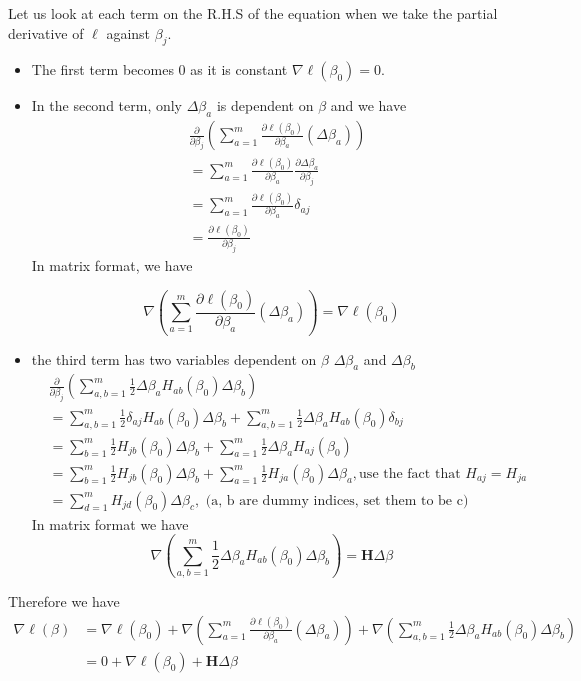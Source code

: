 \documentclass[12pt, oneside]{article}
\begin{document}
Let us look at each term on the R.H.S of the equation when we take the partial derivative of $\ell$ against $\beta_j$. 
\begin{itemize}
\item The first term becomes 0 as it is constant $\nabla \ell(\beta_0)=0$.
\item In the second term, only $\Delta\beta_a$ is dependent on $\beta$ and we have
\begin{align*}
&\frac{\partial}{\partial\beta_j}\left(\sum\limits_{a=1}^m\frac{\partial{\ell(\beta_0)}}{\partial\beta_a}(\Delta\beta_a)\right)\\
&=\sum\limits_{a=1}^m\frac{\partial{\ell(\beta_0)}}{\partial\beta_a}\frac{\partial \Delta\beta_a}{\partial\beta_j}\\
&=\sum\limits_{a=1}^m\frac{\partial{\ell(\beta_0)}}{\partial\beta_a}\delta_{aj}\\
&=\frac{\partial{\ell(\beta_0)}}{\partial\beta_j}
\end{align*}
In matrix format, we have 

$$\nabla\left(\sum\limits_{a=1}^m\frac{\partial{\ell(\beta_0)}}{\partial\beta_a}(\Delta\beta_a)\right)= \nabla \ell(\beta_0)$$

\item  the third term has two variables dependent on $\beta$ $\Delta\beta_a$ and $\Delta\beta_b$
\begin{align*}
&\frac{\partial}{\partial\beta_j}\left(\sum\limits_{a,b=1}^m\frac{1}{2}\Delta\beta_a{H_{ab}}(\beta_0)\Delta\beta_b\right)\\
&=\sum\limits_{a,b=1}^m\frac{1}{2}\delta_{aj}{H_{ab}}(\beta_0)\Delta\beta_b+\sum\limits_{a,b=1}^m\frac{1}{2}\Delta\beta_a{H_{ab}}(\beta_0)\delta_{bj}\\
&=\sum\limits_{b=1}^m\frac{1}{2}{H_{jb}}(\beta_0)\Delta\beta_b+\sum\limits_{a=1}^m\frac{1}{2}\Delta\beta_a{H_{aj}}(\beta_0)\\
&=\sum\limits_{b=1}^m\frac{1}{2}{H_{jb}}(\beta_0)\Delta\beta_b+\sum\limits_{a=1}^m\frac{1}{2}{H_{ja}}(\beta_0)\Delta\beta_a, \text{use the fact that } H_{aj}=H_{ja}\\
&=\sum\limits_{d=1}^m{H_{jd}}(\beta_0)\Delta\beta_{c}, \text{ (a, b are dummy indices, set them to be c)}
\end{align*}
In matrix format we have $$\nabla\left(\sum\limits_{a,b=1}^m\frac{1}{2}\Delta\beta_a{H_{ab}}(\beta_0)\Delta\beta_b\right)=\mathbf{H}\Delta\beta$$
\end{itemize}

Therefore we have
\begin{align}
\nabla \ell(\beta)&=\nabla \ell(\beta_0)+\nabla\left(\sum\limits_{a=1}^m\frac{\partial{\ell(\beta_0)}}{\partial\beta_a}(\Delta\beta_a)\right)+\nabla\left(\sum\limits_{a,b=1}^m\frac{1}{2}\Delta\beta_a{H_{ab}}(\beta_0)\Delta\beta_b\right)\\
& =0+\nabla \ell(\beta_0)+\mathbf{H}\Delta\beta
\end{align}
\end{document}
